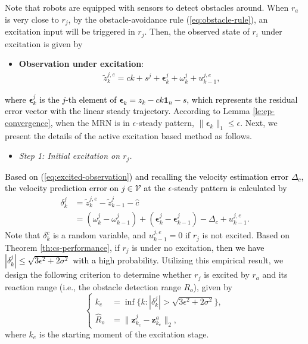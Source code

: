 \documentclass[12pt,journal,draftclsnofoot,onecolumn]{IEEEtran}
\begin{document}
Note that robots are equipped with sensors to detect obstacles around. 
When $r_a$ is very close to $r_j$, by the obstacle-avoidance rule (\ref{eq:obstacle-rule}), an excitation input will be triggered in $r_j$. 
Then, the observed state of $r_i$ under excitation is given by 
\begin{itemize}
\item \textbf{Observation under excitation}: 
\begin{align}\label{eq:excited-observation}
\tilde z_{k}^{j,e} = ck+s^{j} + \bm{\epsilon}_{k}^{j}+ \omega_{k}^{j} + u_{k-1}^{j,e},
\end{align}
\end{itemize}
\textcolor{black}{where $\bm{\epsilon}_{k}^{j}$ is the $j$-th element of $\bm{\epsilon}_{k}=z_k-{c} k \bm{1}_n -s$, which represents the residual error vector with the linear steady trajectory. }
According to Lemma \ref{le:ep-convergence}, when the MRN is in $\epsilon$-steady pattern, $ \| \bm{\epsilon}_{k} \|_1\le \epsilon$. 
Next, we present the details of the active excitation based method as follows. 

\begin{itemize}
\item \textit{Step 1: Initial excitation on $r_j$.}
\end{itemize}

\textcolor{black}{Based on (\ref{eq:excited-observation}) and recalling the velocity estimation error $\Delta_c$, the velocity prediction error on $j\in\mathcal{V}$ at the $\epsilon$-steady pattern is calculated by} 
\begin{align}\label{eq:excitation-j}
\delta_{k}^{j} &=\tilde z_{k}^{j,e} - \tilde z_{k-1}^{j} - \hat c \nonumber \\
&= (\omega_{k}^{j}- \omega_{k-1}^{j} ) + ( \bm{\epsilon}_k^{j}-\bm{\epsilon}_{k-1}^{j}) - \Delta_c + u_{k-1}^{j,e}.
\end{align}
Note that $\delta_{k}^{c}$ is a random variable, and $u_{k-1}^{j,e}\!=\!0$ if $r_j$ is not excited. 
Based on Theorem \ref{th:cs-performance}, if $r_j$ is under no excitation, \textcolor{black}{then we have $|\delta_{k}^{j}|\!\le\! \sqrt{3\epsilon^2\!+\!2\sigma^2}$ with a high probability. }
Utilizing this empirical result, we design the following criterion to determine whether $r_j$ is excited by $r_a$ and its reaction range (i.e., the obstacle detection range $R_o$), given by
\begin{equation} \label{eq:estimator-Ro}
 \left \{  
\begin{aligned}
k_e&=\inf\{k:| \delta_{k}^{j}  |>\sqrt{3\epsilon^2+2\sigma^2}\}, \\
\hat{R}_o &=\| {\mathbf z}_{k_e}^{j} - {\mathbf z}_{k_e}^{a} \|_2, 
\end{aligned} \right.
\end{equation}
where $k_e$ is the starting moment of the excitation stage. 
\end{document}
